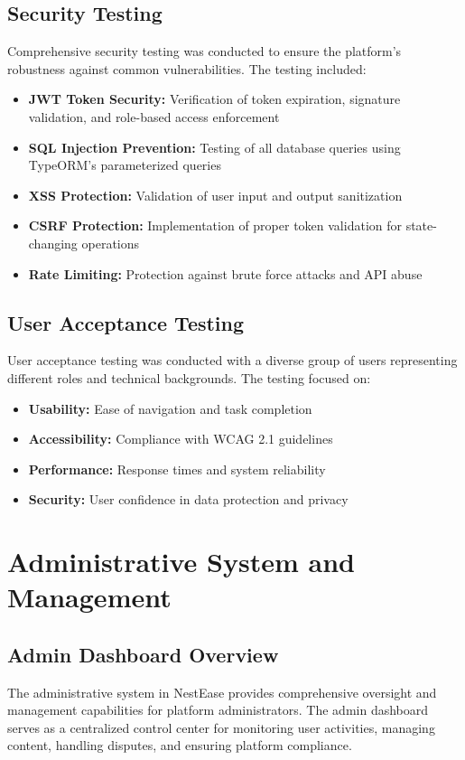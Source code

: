 \documentclass[conference]{IEEEtran}
\begin{document}
\subsection{Security Testing}
Comprehensive security testing was conducted to ensure the platform's robustness against common vulnerabilities. The testing included:

\begin{itemize}
    \item \textbf{JWT Token Security:} Verification of token expiration, signature validation, and role-based access enforcement
    \item \textbf{SQL Injection Prevention:} Testing of all database queries using TypeORM's parameterized queries
    \item \textbf{XSS Protection:} Validation of user input and output sanitization
    \item \textbf{CSRF Protection:} Implementation of proper token validation for state-changing operations
    \item \textbf{Rate Limiting:} Protection against brute force attacks and API abuse
\end{itemize}

\subsection{User Acceptance Testing}
User acceptance testing was conducted with a diverse group of users representing different roles and technical backgrounds. The testing focused on:

\begin{itemize}
    \item \textbf{Usability:} Ease of navigation and task completion
    \item \textbf{Accessibility:} Compliance with WCAG 2.1 guidelines
    \item \textbf{Performance:} Response times and system reliability
    \item \textbf{Security:} User confidence in data protection and privacy
\end{itemize}

\section{Administrative System and Management}
\subsection{Admin Dashboard Overview}
The administrative system in NestEase provides comprehensive oversight and management capabilities for platform administrators. The admin dashboard serves as a centralized control center for monitoring user activities, managing content, handling disputes, and ensuring platform compliance.
\end{document}
